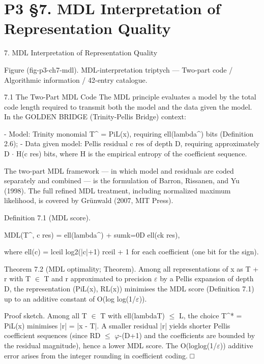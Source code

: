 
\section{P3 §7. MDL Interpretation of Representation Quality}

7. MDL Interpretation of Representation Quality

  Figure (fig-p3-ch7-mdl). MDL-interpretation triptych --- Two-part code / Algorithmic information /
                                        42-entry catalogue.

  7.1 The Two-Part MDL Code
  The MDL principle evaluates a model by the total code length required to transmit both
  the model and the data given the model. In the GOLDEN BRIDGE (Trinity-Pellis Bridge) context:

  - Model: Trinity monomial T\textasciicircum{} = PiL(x), requiring ell(lambda\textasciicircum{}) bits (Definition 2.6);
  - Data given model: Pellis residual c res of depth D, requiring approximately D $\cdot$ H(c res)
  bits, where H is the empirical entropy of the coefficient sequence.

  The two-part MDL framework --- in which model and residuals are coded separately and
  combined --- is the formulation of Barron, Rissanen, and Yu (1998). The full refined
  MDL treatment, including normalized maximum likelihood, is covered by Grünwald
  (2007, MIT Press).

        Definition 7.1 (MDL score).

  MDL(T\textasciicircum{}, c res) = ell(lambda\textasciicircum{}) + sumk=0D ell(ck res),

  where ell(c) = lceil log2(|c|+1) rceil + 1 for each coefficient (one bit for the sign).

        Theorem 7.2 (MDL optimality; Theorem). Among all representations of x as T
        + r with T $\in$ T and r approximated to precision $\varepsilon$ by a Pellis expansion of depth D,
        the representation (PiL(x), RL(x)) minimises the MDL score (Definition 7.1) up to
        an additive constant of O(log log(1/$\varepsilon$)).

  Proof sketch. Among all T $\in$ T with ell(lambdaT) $\leq$ L, the choice T\textasciicircum{}* = PiL(x) minimises
  |r| = |x - T|. A smaller residual |r| yields shorter Pellis coefficient sequences (since RD $\leq$
  $\varphi$-(D+1) and the coefficients are bounded by the residual magnitude), hence a lower
  MDL score. The O(loglog(1/$\varepsilon$)) additive error arises from the integer rounding in
  coefficient coding. □

